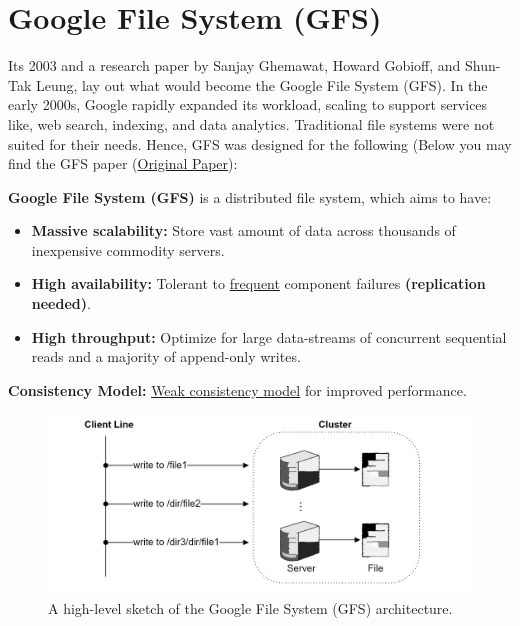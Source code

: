 \newpage 
\section{Google File System (GFS)}
\label{sec:gfs}

\noindent
Its 2003 and a research paper by Sanjay Ghemawat, Howard Gobioff, and Shun-Tak Leung, lay out
what would become the Google File System (GFS). In the early 2000s,
Google rapidly expanded its workload, scaling to support services like,
web search, indexing, and data analytics. Traditional file 
systems were not suited for their needs. Hence, GFS was designed for the following (Below you may find the GFS paper
(\href{https://static.googleusercontent.com/media/research.google.com/en//archive/gfs-sosp2003.pdf}{Original Paper}):

\begin{Def}
  
  \textbf{Google File System (GFS)} is a distributed file system, which aims to have:
  \begin{itemize}
    \item \textbf{Massive scalability:} Store vast amount of data across thousands of inexpensive commodity servers.
    \item \textbf{High availability:} Tolerant to \underline{frequent} component failures \textbf{(replication needed)}.
    \item \textbf{High throughput:} Optimize for large data-streams of concurrent sequential reads and a majority of append-only writes.
  \end{itemize}

  \noindent
  \textbf{Consistency Model:} \underline{Weak consistency model} for improved performance.
\end{Def}

\vspace{1em}
\begin{figure}[h]
  \centering
  \includegraphics[width=\textwidth]{Sections/gfs/gfs.png}
  \caption{A high-level sketch of the Google File System (GFS) architecture.}
  \label{fig:gfs-architecture}

\end{figure}


